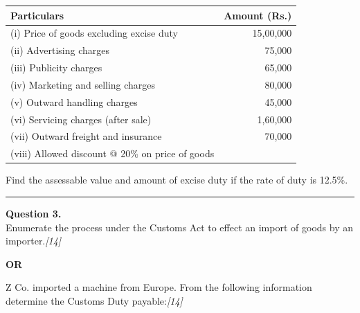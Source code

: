 \documentclass[11pt,a4paper]{article}
\newcommand{\pts}[1]{\hfill   \textit{[#1]}}
\begin{document}
\begin{center}
\renewcommand{\arraystretch}{1.1}

\begin{tabular}{lr}
  \hline
   \textbf{Particulars} &   \textbf{Amount (Rs.)} \\ \hline
  (i) Price of goods excluding excise duty & 15,00,000 \\
  (ii) Advertising charges & 75,000 \\
  (iii) Publicity charges & 65,000 \\
  (iv) Marketing and selling charges & 80,000 \\
  (v) Outward handling charges & 45,000 \\
  (vi) Servicing charges (after sale) & 1,60,000 \\
  (vii) Outward freight and insurance & 70,000 \\
  (viii) Allowed discount @ 20\% on price of goods & \\ \hline
\end{tabular}
\end{center}
Find the assessable value and amount of excise duty if the rate of duty is 12.5\%.

\medskip\rule{\linewidth}{0.2pt}

\pagebreak




\noindent   \textbf{Question 3.} \\
Enumerate the process under the Customs Act to effect an import of goods by an importer.\pts{14}

\centerline{   \textbf{OR}}

Z Co. imported a machine from Europe. From the following information determine the Customs Duty payable:\pts{14}
\end{document}
